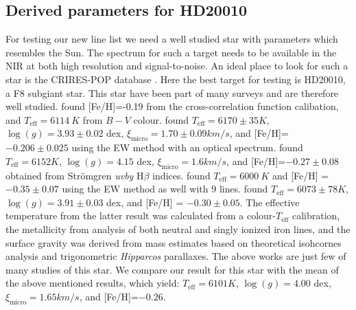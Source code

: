 \documentclass{aa}
\begin{document}
\subsection{Derived parameters for HD20010}
\label{sec:derived_parameters_of_hd20010}

For testing our new line list we need a well studied star with
parameters which resembles the Sun. The spectrum for such a target
needs to be available in the NIR at both high resolution and
signal-to-noise. An ideal place to look for such a star is the
CRIRES-POP database \citep{Lebzelter2012}. Here the best target for
testing is HD20010, a F8 subgiant star. This star have been part of
many surveys and are therefore well studied. \cite{Mortier2013} found
[Fe/H]=-0.19 from the cross-correlation function calibation, and
$T_\mathrm{eff}=\SI{6114}{K}$ from $B-V$ colour. \cite{Gonzalez2010}
found $T_\mathrm{eff} = 6170\pm35\si{K}$, $\log(g) = 3.93\pm0.02$ dex,
$\xi_\mathrm{micro} = 1.70\pm0.09\si{km/s}$, and [Fe/H]=$-0.206\pm0.025$
using the EW method with an optical spectrum. \cite{Balachandran1990}
found $T_\mathrm{eff} = 6152\si{K}$, $\log(g) = 4.15$ dex,
$\xi_\mathrm{micro} = 1.6\si{km/s}$, and [Fe/H]=$-0.27\pm0.08$ obtained
from Str\"{o}mgren \emph{uvby} H$\beta$ indices. \cite{Favata1997} found
$T_\mathrm{eff}=\SI{6000}{K}$ and [Fe/H] = $-0.35\pm0.07$ using the EW
method as well with 9 lines. \cite{Ramirez2012} found $T_\mathrm{eff}
= 6073\pm78\si{K}$, $\log(g) = 3.91\pm0.03$ dex, and [Fe/H] =
$-0.30\pm0.05$. The effective temperature from the latter result was
calculated from a colour-$T_\mathrm{eff}$ calibration, the metallicity
from analysis of both neutral and singly ionized iron lines, and the
surface gravity was derived from mass estimates based on theoretical
isohcornes analysis and trigonometric \emph{Hipparcos} parallaxes. The
above works are just few of many studies of this star. We compare our
result for this star with the mean of the above mentioned results,
which yield: $T_\mathrm{eff} = 6101\si{K}$, $\log(g) = 4.00$ dex,
$\xi_\mathrm{micro} = 1.65\si{km/s}$, and [Fe/H]=$-0.26$.
\end{document}
